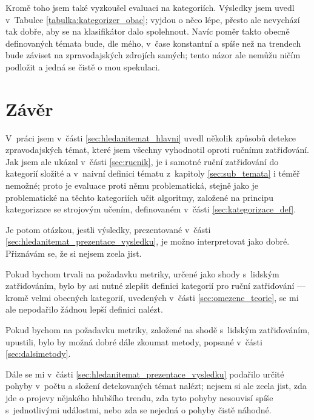 \documentclass[12pt,a4paper]{report}
\begin{document}
Kromě toho jsem také vyzkoušel evaluaci na  kategoriích. Výsledky jsem uvedl v~Tabulce \ref{tabulka:kategorizer_obac}; vyjdou o něco lépe, přesto ale nevychází tak dobře, aby se na klasifikátor dalo spolehnout. Navíc poměr takto obecně definovaných témata bude, dle mého, v~čase konstantní a spíše než na trendech bude záviset na zpravodajských zdrojích samých; tento názor ale nemůžu ničím podložit a jedná se čistě o mou spekulaci.

\chapter*{Závěr}




V~práci jsem v~části \ref{sec:hledanitemat_hlavni} uvedl několik způsobů detekce zpravodajských témat, které jsem všechny vyhodnotil oproti ručnímu zatřiďování. Jak jsem ale ukázal v~části \ref{sec:rucnik}, je i samotné ruční zatřiďování do kategorií složité a v~naivní definici tématu z~kapitoly \ref{sec:sub_temata} i téměř nemožné; proto je evaluace proti němu problematická, stejně jako je problematické na těchto kategoriích učit algoritmy, založené na principu kategorizace se strojovým učením, definovaném v~části \ref{sec:kategorizace_def}.

Je potom otázkou, jestli výsledky, prezentované v~části \ref{sec:hledanitemat_prezentace_vysledku}, je možno interpretovat jako dobré. Přiznávám se, že si nejsem zcela jist.

Pokud bychom trvali na požadavku metriky, určené jako shody s~lidským zatřiďováním, bylo by asi nutné zlepšit definici kategorií pro ruční zatřiďování --- kromě velmi obecných kategorií, uvedených v~části \ref{sec:omezene_teorie}, se mi ale nepodařilo žádnou lepší definici nalézt. 

Pokud bychom na požadavku metriky, založené na shodě s~lidským zatřiďováním, upustili, bylo by možná dobré dále zkoumat metody, popsané v~části \ref{sec:dalsimetody}.

Dále se mi v~části \ref{sec:hledanitemat_prezentace_vysledku} podařilo určité pohyby v~počtu a složení detekovaných témat nalézt; nejsem si ale zcela jist, zda jde o projevy nějakého hlubšího trendu, zda tyto pohyby nesouvisí spíše s~jednotlivými událostmi, nebo zda se nejedná o pohyby čistě náhodné.


\def\bibname{Seznam použité literatury}
\end{document}
